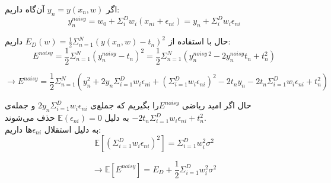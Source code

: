 

اگر $y_n = y(x_n, w)$ آن‌گاه داریم:
$$
y^{noisy}_n = w_0 + \Sigma_i^{D} w_i(x_{ni} + \epsilon_{ni}) 
= y_n + \Sigma_i^{D}w_i\epsilon_{ni}
$$

حال با استفاده از 
$
E_D(w) = \frac{1}{2} \Sigma_{n = 1}^{N}(y(x_n, w) - t_n)^2
$
داریم:
$$
E^{noisy} = 
\frac{1}{2}\Sigma_{n = 1}^{N}(y^{noisy}_{n} - t_n)^2 
= \frac{1}{2}\Sigma_{n =  1}^{N}(y_n^{noisy \: 2} - 2y_n^{noisy}t_n + t_n^2)
$$

$$
\rightarrow E^{noisy} = 
\frac{1}{2} \Sigma_{n = 1}^{N}(y_n^2 + 2y_n\Sigma_{i = 1}^{D}w_i\epsilon_{ni} + (\Sigma_{i = 1}^{D}w_i\epsilon_{ni})^2 - 2t_ny_n - 2t_n\Sigma_{i = 1}^{D}w_i\epsilon_{ni} + t_n^2)
$$

حال اگر امید ریاضی $E^{noisy}$را بگیریم که جملع‌ی  $2y_n\Sigma_{i = 1}^{D}w_i\epsilon_{ni}$ و جمله‌ی 
$
- 2t_n\Sigma_{i = 1}^{D}w_i\epsilon_{ni} + t_n^2
$
به دلیل 
$
\mathbb{E}(\epsilon_{ni}) = 0
$
حذف می‌شوند. 
\\
به دلیل استقلال $\epsilon_{ni}$ها داریم:
$$
\mathbb{E}[(\Sigma_{i = 1}^{D}w_i\epsilon_{ni})^2] = \Sigma_{i = 1}^{D}w_i^2\sigma^2
$$

$$
\rightarrow \mathbb{E}[E^{noisy}] = E_D + \frac{1}{2} \Sigma_{i = 1}^{D} w_i^2\sigma^2
$$
